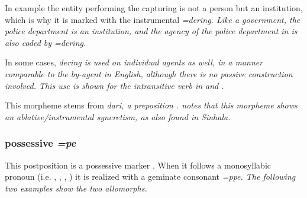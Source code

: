 In example  the entity performing the capturing is not a person but an institution, which is why it is marked with the instrumental \em =dering\em.
Like a government, the police department is an institution, and the agency of the police department in  is also coded by \em =dering\em.


In some cases, \em dering \em is used on individual agents as well, in a manner comparable to the \em by-agent \em in English, although there is no passive construction involved. This use is shown for the intransitive verb  in  and .



  
This morpheme  stems from \em *dari\em, a preposition \citep[141]{Bakker2006}.
\citet{Ansaldo2005ms} notes that this morpheme shows an ablative/instrumental syncretism, as also found in Sinhala.


\subsubsection{possessive \em =pe\em}\label{sec:morph:=pe}
This postposition  is a possessive marker
\citep{Adelaar1991,
SmithEtAl2004,
Ansaldo2005ms,%
Ansaldo2008genesis,%
Ansaldo2009book}. When it follows a monosyllabic pronoun (i.e.
,
,
,
)
it is realized with a geminate consonant \em =ppe\em. The following two examples show the two allomorphs.
 
